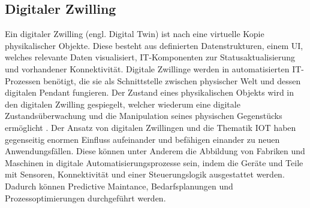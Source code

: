 \subsection{Digitaler Zwilling}
\label{subsec:fundamentals:iot:digitaltwins}
Ein digitaler Zwilling (engl. Digital Twin) ist nach \cite{deloitte2018} eine virtuelle Kopie physikalischer Objekte. Diese besteht aus definierten Datenstrukturen, einem \ac{UI}, welches relevante Daten visualisiert, IT-Komponenten zur Statusaktualisierung und vorhandener Konnektivität. Digitale Zwillinge werden in automatisierten IT-Prozessen benötigt, die sie als Schnittstelle zwischen physischer Welt und dessen digitalen Pendant fungieren. Der Zustand eines physikalischen Objekts wird in den digitalen Zwilling gespiegelt, welcher wiederum eine digitale Zustandsüberwachung und die Manipulation seines physischen Gegenstücks ermöglicht \cite{deloitte2018}. Der Ansatz von digitalen Zwillingen und die Thematik \ac{IOT} haben gegenseitig enormen Einfluss aufeinander und befähigen einander zu neuen Anwendungsfällen. Diese können unter Anderem die Abbildung von Fabriken und Maschinen in digitale Automatisierungsprozesse sein, indem die Geräte und Teile mit Sensoren, Konnektivität und einer Steuerungslogik ausgestattet werden. Dadurch können Predictive Maintance, Bedarfsplanungen und Prozessoptimierungen durchgeführt werden.
